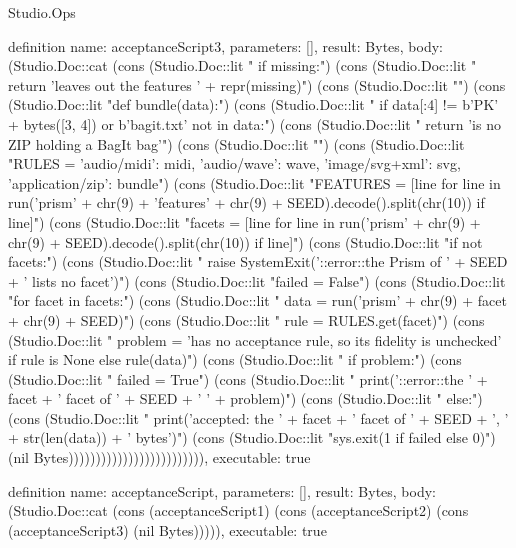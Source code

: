 \begin{lexlean}{Studio.Ops}
\begin{semanticmodule}
{definition{
  name: acceptanceScript3,
  parameters: [],
  result: Bytes,
  body: (Studio.Doc::cat
    (cons (Studio.Doc::lit "    if missing:\n")
    (cons (Studio.Doc::lit "        return 'leaves out the features ' + repr(missing)\n")
    (cons (Studio.Doc::lit "\n")
    (cons (Studio.Doc::lit "def bundle(data):\n")
    (cons (Studio.Doc::lit "    if data[:4] != b'PK' + bytes([3, 4]) or b'bagit.txt' not in data:\n")
    (cons (Studio.Doc::lit "        return 'is no ZIP holding a BagIt bag'\n")
    (cons (Studio.Doc::lit "\n")
    (cons (Studio.Doc::lit "RULES = {'audio/midi': midi, 'audio/wave': wave, 'image/svg+xml': svg, 'application/zip': bundle}\n")
    (cons (Studio.Doc::lit "FEATURES = [line for line in run('prism' + chr(9) + 'features' + chr(9) + SEED).decode().split(chr(10)) if line]\n")
    (cons (Studio.Doc::lit "facets = [line for line in run('prism' + chr(9) + chr(9) + SEED).decode().split(chr(10)) if line]\n")
    (cons (Studio.Doc::lit "if not facets:\n")
    (cons (Studio.Doc::lit "    raise SystemExit('::error::the Prism of ' + SEED + ' lists no facet')\n")
    (cons (Studio.Doc::lit "failed = False\n")
    (cons (Studio.Doc::lit "for facet in facets:\n")
    (cons (Studio.Doc::lit "    data = run('prism' + chr(9) + facet + chr(9) + SEED)\n")
    (cons (Studio.Doc::lit "    rule = RULES.get(facet)\n")
    (cons (Studio.Doc::lit "    problem = 'has no acceptance rule, so its fidelity is unchecked' if rule is None else rule(data)\n")
    (cons (Studio.Doc::lit "    if problem:\n")
    (cons (Studio.Doc::lit "        failed = True\n")
    (cons (Studio.Doc::lit "        print('::error::the ' + facet + ' facet of ' + SEED + ' ' + problem)\n")
    (cons (Studio.Doc::lit "    else:\n")
    (cons (Studio.Doc::lit "        print('accepted: the ' + facet + ' facet of ' + SEED + ', ' + str(len(data)) + ' bytes')\n")
    (cons (Studio.Doc::lit "sys.exit(1 if failed else 0)\n")
    (nil Bytes))))))))))))))))))))))))),
  executable: true
}

definition{
  name: acceptanceScript,
  parameters: [],
  result: Bytes,
  body: (Studio.Doc::cat (cons (acceptanceScript1) (cons (acceptanceScript2) (cons (acceptanceScript3) (nil Bytes))))),
  executable: true
}

}
\end{semanticmodule}
\end{lexlean}

